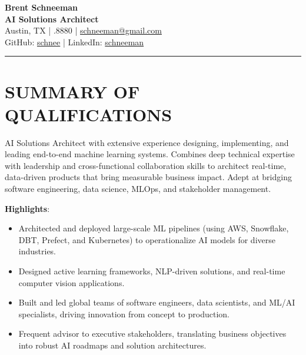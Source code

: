 \documentclass[11pt]{article}
\begin{document}
\begin{center}
{\LARGE \textbf{Brent Schneeman}}\\
\textbf{AI Solutions Architect}\\[6pt]
Austin, TX \quad | .8880 \quad | \quad \href{mailto:schneeman@gmail.com}{schneeman@gmail.com}\\
GitHub: \href{https://github.com/schnee}{schnee} \quad | \quad LinkedIn: \href{https://linkedin.com/in/schneeman}{schneeman}
\end{center}

\vspace{1em}
\hrule
\vspace{1em}

\section*{SUMMARY OF QUALIFICATIONS}
AI Solutions Architect with extensive experience designing, implementing, and leading end-to-end machine learning systems. Combines deep technical expertise with leadership and cross-functional collaboration skills to architect real-time, data-driven products that bring measurable business impact. Adept at bridging software engineering, data science, MLOps, and stakeholder management.

\textbf{Highlights}:
\begin{itemize}[leftmargin=*]
  \item Architected and deployed large-scale ML pipelines (using AWS, Snowflake, DBT, Prefect, and Kubernetes) to operationalize AI models for diverse industries.
  \item Designed active learning frameworks, NLP-driven solutions, and real-time computer vision applications.
  \item Built and led global teams of software engineers, data scientists, and ML/AI specialists, driving innovation from concept to production.
  \item Frequent advisor to executive stakeholders, translating business objectives into robust AI roadmaps and solution architectures.
\end{itemize}

\end{document}
